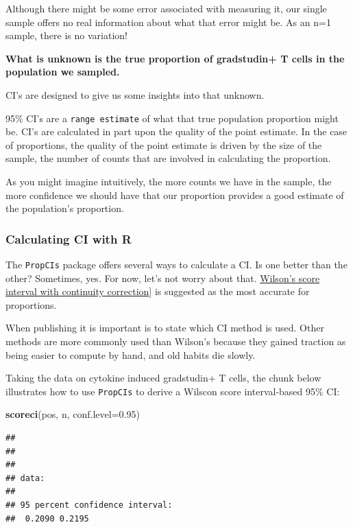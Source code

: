 \documentclass[]{book}
\newenvironment{Shaded}{\begin{snugshade}}{\end{snugshade}}
\newcommand{\DataTypeTok}[1]{\textcolor[rgb]{0.13,0.29,0.53}{#1}}
\newcommand{\FloatTok}[1]{\textcolor[rgb]{0.00,0.00,0.81}{#1}}
\newcommand{\KeywordTok}[1]{\textcolor[rgb]{0.13,0.29,0.53}{\textbf{#1}}}
\newcommand{\NormalTok}[1]{#1}
\begin{document}
Although there might be some error associated with measuring it, our single sample offers no real information about what that error might be. As an n=1 sample, there is no variation!

\textbf{What is unknown is the true proportion of gradstudin+ T cells in the population we sampled.}

CI's are designed to give us some insights into that unknown.

95\% CI's are a \texttt{range\ estimate} of what that true population proportion might be. CI's are calculated in part upon the quality of the point estimate. In the case of proportions, the quality of the point estimate is driven by the size of the sample, the number of counts that are involved in calculating the proportion.

As you might imagine intuitively, the more counts we have in the sample, the more confidence we should have that our proportion provides a good estimate of the population's proportion.

\hypertarget{calculating-ci-with-r}{%
\subsubsection{Calculating CI with R}\label{calculating-ci-with-r}}

The \texttt{PropCIs} package offers several ways to calculate a CI. Is one better than the other? Sometimes, yes. For now, let's not worry about that. \href{http://www.ucl.ac.uk/english-usage/staff/sean/resources/binomialpoisson.pdf}{Wilson's score interval with continuity correction}{]} is suggested as the most accurate for proportions.

When publishing it is important is to state which CI method is used. Other methods are more commonly used than Wilson's because they gained traction as being easier to compute by hand, and old habits die slowly.

Taking the data on cytokine induced gradstudin+ T cells, the chunk below illustrates how to use \texttt{PropCIs} to derive a Wilscon score interval-based 95\% CI:

\begin{Shaded}
\begin{Highlighting}[]
\KeywordTok{scoreci}\NormalTok{(pos, n, }\DataTypeTok{conf.level=}\FloatTok{0.95}\NormalTok{)}
\end{Highlighting}
\end{Shaded}

\begin{verbatim}
## 
## 
## 
## data:  
## 
## 95 percent confidence interval:
##  0.2090 0.2195
\end{verbatim}
\end{document}
